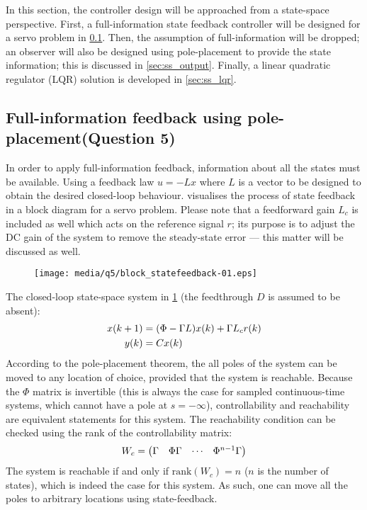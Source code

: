 In this section, the controller design will be approached from a state-space perspective. First, a full-information state feedback controller will be designed for a servo problem in \cref{sec:ss_full}. Then, the assumption of full-information will be dropped; an observer will also be designed using pole-placement to provide the state information; this is discussed in \cref{sec:ss_output}. Finally, a linear quadratic regulator (LQR) solution is developed in \cref{sec:ss_lqr}.

\subsection{Full-information feedback using pole-placement\textnormal{\phantom{xxx}(Question 5)}}
\label{sec:ss_full}
In order to apply full-information feedback, information about all the states must be available. Using a feedback law $u = -Lx$ where $L$ is a vector to be designed to obtain the desired closed-loop behaviour.  visualises the process of state feedback in a block diagram for a servo problem. Please note that a feedforward gain $L_c$ is included as well which acts on the reference signal $r$; its purpose is to adjust the DC gain of the system to remove the steady-state error --- this matter will be discussed as well.
\begin{figure}[ht]
    \centering
    \texttt{[image: media/q5/block\_statefeedback-01.eps]}
    \caption{}
    \label{fig:q5_block_statefeedback}
\end{figure}
The closed-loop state-space system in \cref{fig:q5_block_statefeedback}  (the feedthrough $D$ is assumed to be absent):
\begin{equation}
    \begin{aligned}
        x(k+1) &= \qty(\Phi - \Gamma L)x(k) + \Gamma L_c r(k)\\
        y(k) &= Cx(k)\\
    \end{aligned}
\end{equation}
According to the pole-placement theorem, the all poles of the system can be moved to any location of choice, provided that the system is reachable. Because the $\Phi$ matrix is invertible (this is always the case for sampled continuous-time systems, which cannot have a pole at $s = -\infty$), controllability and reachability are equivalent statements for this system. The reachability condition can be checked using the rank of the controllability matrix:
$$ W_c = \mqty(\Gamma & \Phi \Gamma & \cdots & \Phi^{n-1}\Gamma)$$
The system is reachable if and only if $\mathrm{rank}(W_c) = n$ ($n$ is the number of states), which is indeed the case for this system. As such, one can move all the poles to arbitrary locations using state-feedback.

